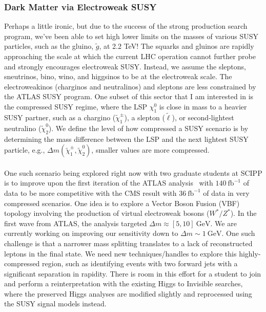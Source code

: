 \subsubsection{Dark Matter via Electroweak SUSY} \label{sssec:dark-matter-via-electroweak-susy}
Perhaps a little ironic, but due to the success of the strong production search program, we've been able to set high lower limits on the masses of various SUSY particles, such as the gluino, $\tilde{g}$, at 2.2 TeV! The squarks and gluinos are rapidly approaching the scale at which the current LHC operation cannot further probe and strongly encourages electroweak SUSY. Instead, we assume the sleptons, sneutrinos, bino, wino, and higgsinos to be at the electroweak scale. The electroweakinos (charginos and neutralinos) and sleptons are less constrained by the ATLAS SUSY program.  One subset of this sector that I am interested in is the compressed SUSY regime, where the LSP $\chi_1^0$ is close in mass to a heavier SUSY partner, such as a chargino ($\tilde{\chi}_1^\pm$), a slepton ($\tilde{\ell}$), or second-lightest neutralino ($\tilde{\chi}_2^0$). We define the level of how compressed a SUSY scenario is by determining the mass difference between the LSP and the next lightest SUSY particle, e.g., $\Delta m(\tilde{\chi}_1^\pm, \tilde{\chi}_2^0)$, smaller values are more compressed.
\\
\\
One such scenario being explored right now with two graduate students at SCIPP is to improve upon the first iteration of the ATLAS analysis~ %
with $140\ \mathrm{fb}^{-1}$ of data to be more competitive with the CMS%
result with $36\ \mathrm{fb}^{-1}$ of data in very compressed scenarios. One idea is to explore a Vector Boson Fusion (VBF) topology involving the production of virtual electroweak bosons ($W^*/ Z^*$). In the first wave from ATLAS, the analysis targeted $\Delta m \approx [5, 10]\ \mathrm{GeV}$. We are currently working on improving our sensitivity down to $\Delta m \sim 1\ \mathrm{GeV}$. One such challenge is that a narrower mass splitting translates to a lack of reconstructed leptons in the final state. We need new techniques/handles to explore this highly-compressed region, such as identifying events with two forward jets with a significant separation in rapidity. There is room in this effort for a student to join and perform a reinterpretation with the existing Higgs to Invisible searches, where the preserved Higgs analyses are modified slightly and reprocessed using the SUSY signal models instead.

